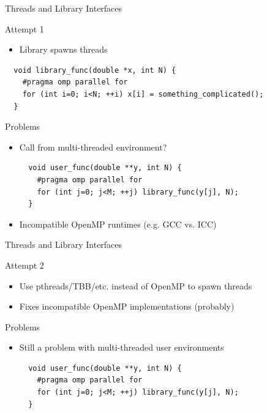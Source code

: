 

\begin{frame}[fragile]{Threads and Library Interfaces}

 \begin{block}{Attempt 1}
  \begin{itemize}
   \item Library spawns threads
  \end{itemize}
 \end{block}

   \begin{lstlisting}
  void library_func(double *x, int N) {
    #pragma omp parallel for
    for (int i=0; i<N; ++i) x[i] = something_complicated();
  }
  \end{lstlisting}

  \begin{block}{Problems}
   \begin{itemize}
    \item Call from multi-threaded environment?
   \begin{lstlisting}
  void user_func(double **y, int N) {
    #pragma omp parallel for
    for (int j=0; j<M; ++j) library_func(y[j], N);
  }
  \end{lstlisting}
    \item Incompatible OpenMP runtimes (e.g. GCC vs. ICC)
   \end{itemize}
 \end{block}

\end{frame}

\begin{frame}[fragile]{Threads and Library Interfaces}

 \begin{block}{Attempt 2}
  \begin{itemize}
   \item Use pthreads/TBB/etc. instead of OpenMP to spawn threads
   \item Fixes incompatible OpenMP implementations (probably)
  \end{itemize}
 \end{block}

  \begin{block}{Problems}
   \begin{itemize}
    \item Still a problem with multi-threaded user environments
   \begin{lstlisting}
  void user_func(double **y, int N) {
    #pragma omp parallel for
    for (int j=0; j<M; ++j) library_func(y[j], N);
  }
   \end{lstlisting}
  \end{itemize}
 \end{block}

\end{frame}


